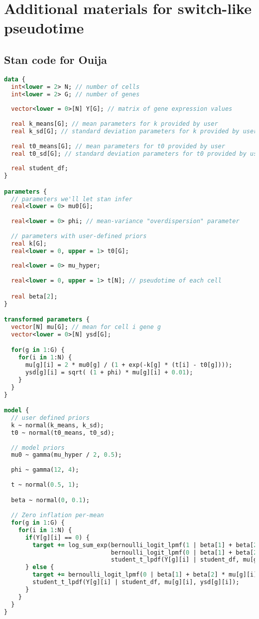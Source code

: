 \chapter{Additional materials for switch-like pseudotime}



\section{Stan code for Ouija} \label{app:ouijastan}


\begin{lstlisting}[language=Stan]
data {
  int<lower = 2> N; // number of cells
  int<lower = 2> G; // number of genes
  
  vector<lower = 0>[N] Y[G]; // matrix of gene expression values
  
  real k_means[G]; // mean parameters for k provided by user
  real k_sd[G]; // standard deviation parameters for k provided by user
  
  real t0_means[G]; // mean parameters for t0 provided by user
  real t0_sd[G]; // standard deviation parameters for t0 provided by user
  
  real student_df;
}

parameters {
  // parameters we'll let stan infer
  real<lower = 0> mu0[G];
  
  real<lower = 0> phi; // mean-variance "overdispersion" parameter 
  
  // parameters with user-defined priors
  real k[G];
  real<lower = 0, upper = 1> t0[G];
  
  real<lower = 0> mu_hyper;
  
  real<lower = 0, upper = 1> t[N]; // pseudotime of each cell

  real beta[2];
}

transformed parameters {
  vector[N] mu[G]; // mean for cell i gene g
  vector<lower = 0>[N] ysd[G];

  for(g in 1:G) {
    for(i in 1:N) {
      mu[g][i] = 2 * mu0[g] / (1 + exp(-k[g] * (t[i] - t0[g])));
      ysd[g][i] = sqrt( (1 + phi) * mu[g][i] + 0.01);
    }
  }
}

model {
  // user defined priors
  k ~ normal(k_means, k_sd);
  t0 ~ normal(t0_means, t0_sd);
  
  // model priors
  mu0 ~ gamma(mu_hyper / 2, 0.5);
  
  phi ~ gamma(12, 4); 
  
  t ~ normal(0.5, 1);

  beta ~ normal(0, 0.1);
  
  // Zero inflation per-mean
  for(g in 1:G) {
    for(i in 1:N) {
      if(Y[g][i] == 0) {
        target += log_sum_exp(bernoulli_logit_lpmf(1 | beta[1] + beta[2] * mu[g][i]),
                              bernoulli_logit_lpmf(0 | beta[1] + beta[2] * mu[g][i]) + 
                              student_t_lpdf(Y[g][i] | student_df, mu[g][i], ysd[g][i]));
      } else {
        target += bernoulli_logit_lpmf(0 | beta[1] + beta[2] * mu[g][i]) + 
        student_t_lpdf(Y[g][i] | student_df, mu[g][i], ysd[g][i]);
      }
    }
  }
}


\end{lstlisting}


